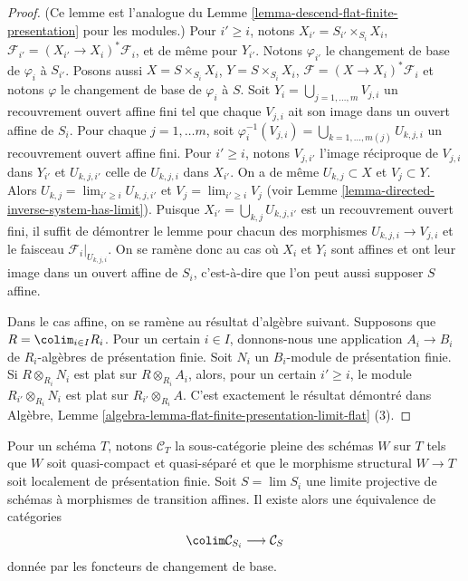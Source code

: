\begin{proof}
(Ce lemme est l'analogue du
Lemme \ref{lemma-descend-flat-finite-presentation}
pour les modules.)
Pour $i' \geq i$, notons $X_{i'} = S_{i'} \times_{S_i} X_i$,
$\mathcal{F}_{i'} = (X_{i'} \to X_i)^*\mathcal{F}_i$, et de même
pour $Y_{i'}$. Notons $\varphi_{i'}$ le changement de base
de $\varphi_i$ à $S_{i'}$. Posons aussi $X = S \times_{S_i} X_i$,
$Y =S \times_{S_i} X_i$, $\mathcal{F} = (X \to X_i)^*\mathcal{F}_i$
et notons $\varphi$ le changement de base de $\varphi_i$ à $S$.
Soit $Y_i = \bigcup_{j = 1, \ldots, m} V_{j, i}$ un recouvrement ouvert affine
fini tel que chaque $V_{j, i}$ ait son image dans un ouvert affine de $S_i$.
Pour chaque $j = 1, \ldots m$, soit
$\varphi_i^{-1}(V_{j, i}) = \bigcup_{k = 1, \ldots, m(j)} U_{k, j, i}$
un recouvrement ouvert affine fini. Pour $i' \geq i$, notons
$V_{j, i'}$ l'image réciproque de $V_{j, i}$ dans $Y_{i'}$ et
$U_{k, j, i'}$ celle de $U_{k, j, i}$ dans $X_{i'}$.
On a de même $U_{k, j} \subset X$ et $V_j \subset Y$.
Alors $U_{k, j} = \lim_{i' \geq i} U_{k, j, i'}$
et $V_j = \lim_{i' \geq i} V_j$
(voir Lemme \ref{lemma-directed-inverse-system-has-limit}).
Puisque $X_{i'} = \bigcup_{k, j} U_{k, j, i'}$ est un recouvrement ouvert fini,
il suffit de démontrer le lemme pour chacun des morphismes
$U_{k, j, i} \to V_{j, i}$ et le faisceau $\mathcal{F}_i|_{U_{k, j, i}}$.
On se ramène donc au cas où $X_i$ et
$Y_i$ sont affines et ont leur image dans un ouvert affine de $S_i$, c'est-à-dire
que l'on peut aussi supposer $S$ affine.

\medskip\noindent
Dans le cas affine, on se ramène au résultat d'algèbre suivant.
Supposons que $R = \colim_{i \in I} R_i$. Pour un certain $i \in I$,
donnons-nous une application $A_i \to B_i$ de $R_i$-algèbres de présentation finie.
Soit $N_i$ un $B_i$-module de présentation finie.
Si $R \otimes_{R_i} N_i$ est plat sur $R \otimes_{R_i} A_i$,
alors, pour un certain $i' \geq i$, le module
$R_{i'} \otimes_{R_i} N_i$ est plat sur $R_{i'} \otimes_{R_i} A$.
C'est exactement le résultat démontré dans
Algèbre,
Lemme \ref{algebra-lemma-flat-finite-presentation-limit-flat} (3).
\end{proof}

\begin{lemma}
\label{lemma-descend-finite-presentation-variant}
Pour un schéma $T$, notons $\mathcal{C}_T$ la sous-catégorie pleine des
schémas $W$ sur $T$ tels que $W$ soit quasi-compact et quasi-séparé
et que le morphisme structural $W \to T$ soit
localement de présentation finie.
Soit $S = \lim S_i$ une limite projective de schémas à morphismes
de transition affines. Il existe alors une équivalence
de catégories
$$
\colim \mathcal{C}_{S_i} \longrightarrow \mathcal{C}_S
$$
donnée par les foncteurs de changement de base.
\end{lemma}

